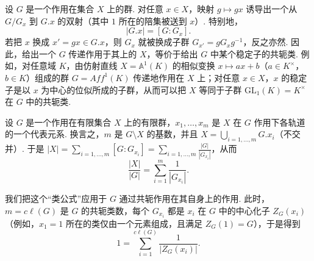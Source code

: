\begin{numpara}\label{np:fg-2-1-5}
设 $G$ 是一个作用在集合 $X$ 上的群. 对任意 $x\in X$，映射 $g\mapsto gx$ 诱导出一个从 $G/G_x$ 到 $G.x$ 的双射（其中 $1$ 所在的陪集被送到 $x$）. 特别地，
\[
|G.x|=[G:G_x].
\]
若把 $x$ 换成 $x'=gx\in G.x$，则 $G_x$ 就被换成子群 $G_{x'}=gG_xg^{-1}$，反之亦然. 因此，给出一个 $G$ 传递作用于其上的 $X$，等价于给出 $G$ 中某个稳定子的共轭类. 例如，对任意域 $K$，由仿射直线 $X=\mathbb{A}^1(K)$ 的相似变换 $x\mapsto ax+b$（$a\in K^\times$，$b\in K$）组成的群 $G=\mathit{Aff}^1(K)$ 传递地作用在 $X$ 上；对任意 $x\in X$，$x$ 的稳定子是以 $x$ 为中心的位似所成的子群，从而可以把 $X$ 等同于子群 $\mathrm{GL}_1(K)=K^\times$ 在 $G$ 中的共轭类.
\end{numpara}
\begin{numpara}\label{np:fg-2-1-6}
设 $G$ 是一个作用在有限集合 $X$ 上的有限群，$x_1,\ldots,x_m$ 是 $X$ 在 $G$ 作用下各轨道的一个代表元系. 换言之，$m$ 是 $G\setminus X$ 的基数，并且 $X=\bigcup_{i=1,\ldots,m}G.x_i$（不交并）. 于是 $|X|=\sum_{i=1,\ldots,m}[G:G_{x_i}]=\sum_{i=1,\ldots,m}\frac{|G|}{|G_{x_i}|}$，从而
\[
\frac{|X|}{|G|}=\sum_{i=1}^{m}\frac{1}{|G_{x_i}|}.
\]
\end{numpara}
我们把这个``类公式''应用于 $G$ 通过共轭作用在其自身上的作用. 此时，$m=c\ell(G)$ 是 $G$ 的共轭类数，每个 $G_{x_i}$ 都是 $x_i$ 在 $G$ 中的中心化子 $Z_G(x_i)$（例如，$x_1=1$ 所在的类仅由一个元素组成，且满足 $Z_G(1)=G$），于是得到
\[
1=\sum_{i=1}^{c\ell(G)}\frac{1}{|Z_G(x_i)|}.
\]
